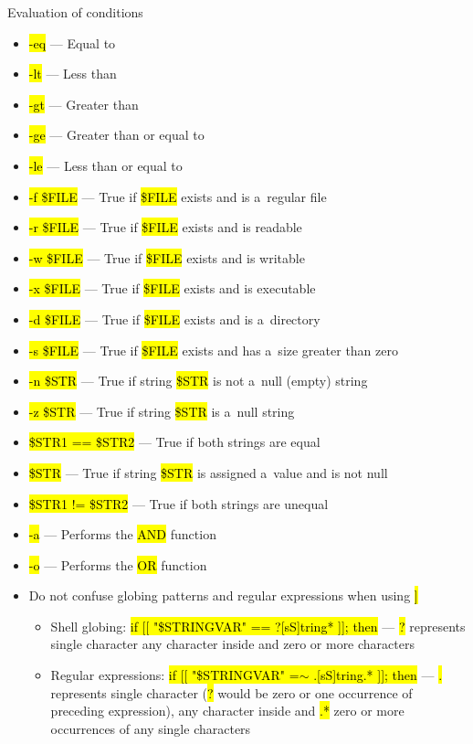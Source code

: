 \documentclass[compress, ucs, xelatex, 11pt, xcolor=svgnames,
  hyperref={
    bookmarks=true,
    unicode=true,
    colorlinks=true,
    pdftitle={Linux, command line and MetaCentrum},
    plainpages=false,
    pdfauthor={Vojtech Zeisek},
    pdfsubject={Course about use of Linux command line, writing shell scripts and using MetaCentrum of CESNET},
    pdfcreator={XeLaTeX},
    pdfkeywords={Linux, GNU, BASH, shell, command line, MetaCentrum},
    linkcolor=DarkRed,
    anchorcolor=DarkBlue,
    citecolor=Indigo,
    filecolor=NavyBlue,
    menucolor=DarkMagenta,
    urlcolor=DarkBlue,
    pdftex},
  url={hyphens, lowtilde} %
  ]{beamer}
\renewcommand{\texttt}[1]{\hl{\ttfamily #1}}
\begin{document}
\begin{frame}[allowframebreaks]{Evaluation of conditions}
\begin{itemize}
\begin{itemize}
\begin{itemize}
      \end{itemize}
    \end{itemize}
    \item \texttt{-eq} --- Equal to
    \item \texttt{-lt} --- Less than
    \item \texttt{-gt} --- Greater than
    \item \texttt{-ge} --- Greater than or equal to
    \item \texttt{-le} --- Less than or equal to
    \item \texttt{-f \$FILE} --- True if \texttt{\$FILE} exists and is a~regular file
    \item \texttt{-r \$FILE} --- True if \texttt{\$FILE} exists and is readable
    \item \texttt{-w \$FILE} --- True if \texttt{\$FILE} exists and is writable
    \item \texttt{-x \$FILE} --- True if \texttt{\$FILE} exists and is executable
    \item \texttt{-d \$FILE} --- True if \texttt{\$FILE} exists and is a~directory
    \item \texttt{-s \$FILE} --- True if \texttt{\$FILE} exists and has a~size greater than zero
    \item \texttt{-n \$STR} --- True if string \texttt{\$STR} is not a~null (empty) string
    \item \texttt{-z \$STR} --- True if string \texttt{\$STR} is a~null string
    \item \texttt{\$STR1 == \$STR2} --- True if both strings are equal
    \item \texttt{\$STR} --- True if string \texttt{\$STR} is assigned a~value and is not null
    \item \texttt{\$STR1 != \$STR2} --- True if both strings are unequal
    \item \texttt{-a} --- Performs the \texttt{AND} function
    \item \texttt{-o} --- Performs the \texttt{OR} function
    \item Do not confuse globing patterns and regular expressions when using \texttt{[[ \ldots~]]}
    \begin{itemize}
      \item Shell globing: \texttt{if [[ "\$STRINGVAR" == ?[sS]tring* ]]; then} --- \texttt{?} represents single character \texttt{[]} any character inside and \texttt{*} zero or more characters
      \item Regular expressions: \texttt{if [[ "\$STRINGVAR" =$\sim$ .[sS]tring.* ]]; then} --- \texttt{.} represents single character (\texttt{?} would be zero or one occurrence of preceding expression), \texttt{[]} any character inside and \texttt{.*} zero or more occurrences of any single characters
    \end{itemize}
  \end{itemize}
\end{frame}
\end{document}
